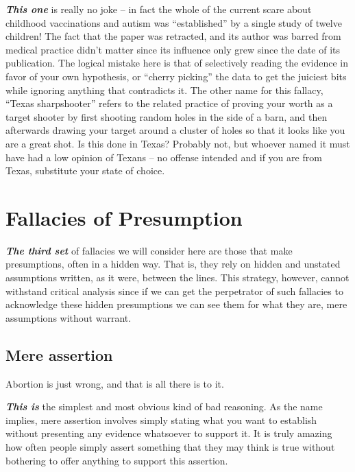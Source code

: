 \documentclass[12pt, openany]{book}
\begin{document}
\textbf{\emph{This one}} is really no joke -- in fact the whole of the current scare about childhood vaccinations and autism was ``established'' by a single study of twelve children! The fact that the paper was retracted, and its author was barred from medical practice didn't matter since its influence only grew since the date of its publication. The logical mistake here is that of selectively reading the evidence in favor of your own hypothesis, or ``cherry picking'' the data to get the juiciest bits while ignoring anything that contradicts it. The other name for this fallacy, ``Texas sharpshooter'' refers to the related practice of proving your worth as a target shooter by first shooting random holes in the side of a barn, and then afterwards drawing your target around a cluster of holes so that it looks like you are a great shot. Is this done in Texas? Probably not, but whoever named it must have had a low opinion of Texans -- no offense intended and if you are from Texas, substitute your state of choice.

\hypertarget{presumption}{%
\section{Fallacies of Presumption}\label{presumption}}

\textbf{\emph{The third set}} of fallacies we will consider here are those that make presumptions, often in a hidden way. That is, they rely on hidden and unstated assumptions written, as it were, between the lines. This strategy, however, cannot withstand critical analysis since if we can get the perpetrator of such fallacies to acknowledge these hidden presumptions we can see them for what they are, mere assumptions without warrant.

\hypertarget{mere-assertion}{%
\subsection*{Mere assertion}\label{mere-assertion}}


\begin{center}

\begin{argument}

Abortion is just wrong, and that is all there is to it.

\end{argument}

\end{center}

\textbf{\emph{This is}} the simplest and most obvious kind of bad reasoning. As the name implies, mere assertion involves simply stating what you want to establish without presenting any evidence whatsoever to support it. It is truly amazing how often people simply assert something that they may think is true without bothering to offer anything to support this assertion.
\end{document}
